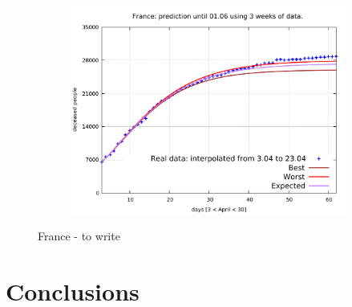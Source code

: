 \documentclass[8pt]{article}
\begin{document}
\begin{figure}[h!]
\begin{subfigure}[b]{0.45\linewidth}
  \includegraphics[width=\linewidth]{../err100p_simulations/fr/3-23/3-23.pdf}
  \end{subfigure}
	\caption{France - to write}
\end{figure}


\section{Conclusions}
\end{document}
